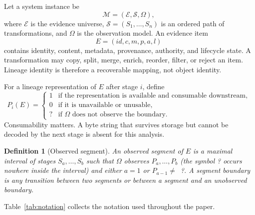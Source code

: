 \documentclass[10pt]{article}
\newtheorem{definition}{Definition}
\begin{document}
Let a system instance be
\begin{equation}
\mathcal{M}=(\mathcal{E},\mathcal{S},\Omega),
\end{equation}
where $\mathcal{E}$ is the evidence universe, $\mathcal{S}=(S_1,\ldots,S_n)$ is an ordered path of transformations, and $\Omega$ is the observation model. An evidence item
\begin{equation}
E=(id,c,m,p,a,l)
\end{equation}
contains identity, content, metadata, provenance, authority, and lifecycle state. A transformation may copy, split, merge, enrich, reorder, filter, or reject an item. Lineage identity is therefore a recoverable mapping, not object identity.

For a lineage representation of $E$ after stage $i$, define
\begin{equation}
P_i(E)=
\begin{cases}
1 & \text{if the representation is available and consumable downstream},\\
0 & \text{if it is unavailable or unusable},\\
? & \text{if }\Omega\text{ does not observe the boundary.}
\end{cases}
\end{equation}
Consumability matters. A byte string that survives storage but cannot be decoded by the next stage is absent for this analysis.

\begin{definition}[Observed segment]\label{def:segment}
An \emph{observed segment} of $E$ is a maximal interval of stages $S_a,\ldots,S_b$ such that $\Omega$ observes $P_a,\ldots,P_b$ (the symbol ? occurs nowhere inside the interval) and either $a=1$ or $P_{a-1}\ne$~?. A segment boundary is any transition between two segments or between a segment and an unobserved boundary.
\end{definition}

Table~\ref{tab:notation} collects the notation used throughout the paper.
\end{document}
